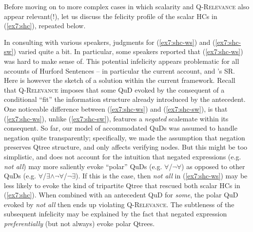Before moving on to more complex cases in which scalarity and \textsc{Q-Relevance} also appear relevant(!), let us discuss the felicity profile of the scalar HCs in (\ref{ex7:shc}), repeated below.

\begin{exe}
	\begin{xlist}
	\end{xlist}
\end{exe}

In consulting with various speakers, judgments for (\ref{ex7:shc-ws}) and (\ref{ex7:shc-sw}) varied quite a bit. In particular, some speakers reported that (\ref{ex7:shc-ws}) was hard to make sense of. This potential infelicity appears problematic for all accounts of Hurford Sentences -- in particular the current account, and \textcite{Kalomoiros2024}'s SR. Here is however the sketch of a solution within the current framework. Recall that \textsc{Q-Relevance} imposes that some QuD evoked by the consequent of a conditional ``fit'' the information structure already introduced by the antecedent. One noticeable difference between (\ref{ex7:shc-ws}) and (\ref{ex7:shc-sw}), is that (\ref{ex7:shc-ws}), unlike (\ref{ex7:shc-sw}), features a \textit{negated} scalemate within its consequent. So far, our model of accommodated QuDs was assumed to handle negation quite transparently; specifically, we made the assumption that negation preserves Qtree structure, and only affects verifying nodes. But this might be too simplistic, and does not account for the intuition that negated expressions (e.g. \textit{not all}) may more saliently evoke ``polar'' QuDs (e.g. $\forall$/$\neg\forall$) as opposed to other QuDs (e.g. $\forall$/$\exists\wedge\neg\forall$/$\neg\exists$). If this is the case, then \textit{not all} in (\ref{ex7:shc-ws}) may be less likely to evoke the kind of tripartite Qtree that rescued both scalar HCs in (\ref{ex7:shc}). When combined with an antecedent QuD for \textit{some}, the polar QuD evoked by \textit{not all} then ends up violating \textsc{Q-Relevance}. The subtleness of the subsequent infelicity may be explained by the fact that negated expression \textit{preferentially} (but not always) evoke polar Qtrees.\\

